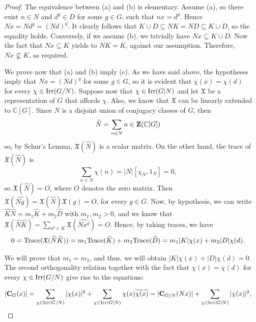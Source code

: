 \documentclass[12pt,leqno,a4paper]{amsart}
\numberwithin{equation}{section}
\begin{document}
\begin{proof}  The  equivalence between (a) and (b) is elementary. Assume (a), so there exist $n\in N$ and $d^g\in D$ for some $g\in G$, such that $nx=d^g$. Hence $Nx=Nd^g=(Nd)^g$. It clearly follows that $K\cup D\subseteq NK=ND\subseteq K\cup D$, so the equality holds. Conversely, if we assume (b), we trivially have $Nx\subseteq K\cup D$. Now the fact that  $Nx\subseteq K$ yields to $NK=K$, against  our assumption. Therefore, $Nx\not\subseteq K$, as required.


\medskip
We prove now that (a) and (b) imply (c). As we have said above, the hypotheses imply that $Nx=(Nd)^g$ for some $g\in G$, so
it is evident that $\chi(x)=\chi(d)$ for every $\chi\in {\rm Irr}(G/N)$.
Suppose now that $\chi\in{\rm Irr}(G|N)$ and let $\mathfrak{X}$ be a representation of $G$ that affords $\chi$.   Also,  we know that $\mathfrak{X}$ can be linearly extended to $\mathbb{C}[G]$.   Since $N$ is a disjoint union of conjugacy classes of $G$, then $$\widehat{ N} = \sum _{n \in N} n\in {\bf Z}(\mathbb{C}[G])$$ so, by Schur's Lemma, $\mathfrak{X}(\widehat{N})$ is a scalar matrix. On the other hand, the trace of $\mathfrak{X}(\widehat{N})$ is $$\sum_{n \in N}\chi(n)=|N|[\chi_N, 1_N] =0,$$ so $\mathfrak{X}(\widehat{N}) = O$, where $O$ denotes the zero matrix. Then $\mathfrak{X}(\widehat{Ng})=\mathfrak{X}(\widehat{N})\mathfrak{X}(g)=O$, for every $g\in G$. Now, by hypothesis, we can write $\widehat{K}\widehat{N} = m_1\widehat{K}+m_2\widehat{D}$ with $m_1, m_2>0$, and we know that $\mathfrak{X}(\widehat{N}\widehat{K})=\sum_{x^g \in K} \mathfrak{X}(\widehat{Nx^g})=O$.
Hence, by taking traces, we have
\begin{equation}
0={\rm Trace}(\mathfrak{X}(\widehat{N}\widehat{K}))=m_1 {\rm Trace}(\widehat{K}) + m_2 {\rm Trace}(\widehat{D})=m_1|K| \chi(x) + m_2|D| \chi(d). \label{eqn1}
\end{equation}

We will prove that $m_1=m_2$, and thus,  we will obtain $|K| \chi(x) +|D| \chi(d)=0$.
The second orthogonality relation together with the fact that  $\chi(x)=\chi(d)$ for every $\chi\in {\rm Irr}(G/N)$  give rise to the equations:

\begin{equation}
|{\bf C}_G(x)|=\sum_{\chi\in {\rm Irr}(G/N)} |\chi(x)|^2
+ \sum_{\chi\in {\rm Irr}(G|N)}
 \chi(x)\overline{\chi(x)}=|{\bf C}_{G/N}(Nx)|+ \sum_{\chi\in {\rm Irr}(G|N)}|\chi(x)|^2,  \label{eqn2}
 \end{equation}


\end{proof}
\end{document}
